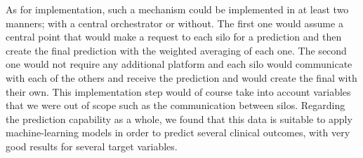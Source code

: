As for implementation, such a mechanism could be implemented in at least two manners; with a central orchestrator or without. The first one would assume a central point that would make a request to each silo for a prediction and then create the final prediction with the weighted averaging of each one. The second one would not require any additional platform and each silo would communicate with each of the others and receive the prediction and would create the final with their own. This implementation step would of course take into account variables that we were out of scope such as the communication between silos. 
Regarding the prediction capability as a whole, we found that this data is suitable to apply machine-learning models in order to predict several clinical outcomes, with very good results for several target variables. 

